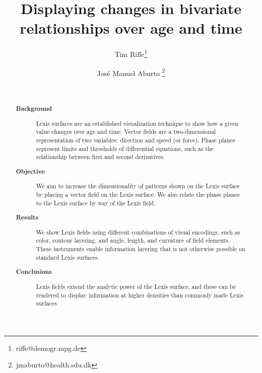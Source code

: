 \documentclass{article}
\begin{document}
\title{Displaying changes in bivariate relationships over age and time}

\author[1]{Tim Riffe\thanks{riffe@demogr.mpg.de}}
\author[2,3]{Jos\'e Manuel Aburto \thanks{jmaburto@health.sdu.dk}}

\maketitle

\begin{abstract}
~
\begin{description}
\item[\textbf{Background}] Lexis surfaces are an established visualization
technique to show how a given value changes over age and time. Vector fields are
a two-dimensional representation of two variables: direction and speed (or
force). Phase planes represent limits and thresholds of differential equations,
such as the relationship between first and second derivatives.
\item[\textbf{Objective}] We aim to increase the dimensionality of patterns
shown on the Lexis surface by placing a vector field on the Lexis surface. We
also relate the phase planes to the Lexis surface by way of the Lexis field. 
\item[\textbf{Results}] We show Lexis fields using different combinations of
visual encodings, such as color, contour layering, and angle, length, and
curvature of field elements. These instruments enable information layering that
is not otherwise possible on standard Lexis surfaces.
\item[\textbf{Conclusions}] Lexis fields extend the analytic power of the Lexis
surface, and these can be rendered to display information at higher densities
than commonly made Lexis surfaces.
\end{description}
\end{abstract}
\end{document}
